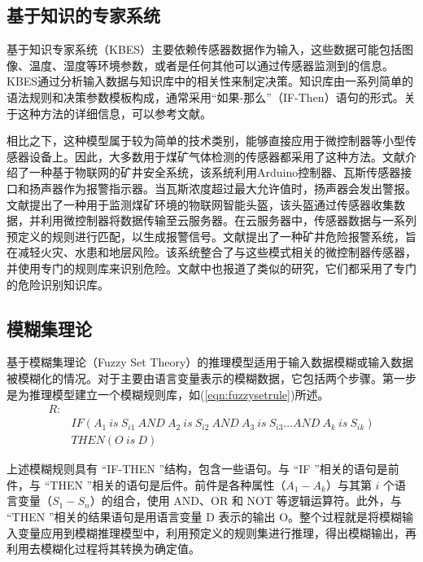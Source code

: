 \documentclass[lang=cn,a4paper,citestyle=gb7714-2015, bibstyle=gb7714-2015]{elegantpaper}
\newcommand{\mycite}[1]{\textsuperscript{\parencite{#1}}}
\begin{document}
    \subsection{基于知识的专家系统}
    基于知识专家系统（KBES）主要依赖传感器数据作为输入，这些数据可能包括图像、温度、湿度等环境参数，或者是任何其他可以通过传感器监测到的信息。KBES通过分析输入数据与知识库中的相关性来制定决策。知识库由一系列简单的语法规则和决策参数模板构成，通常采用“如果-那么”（IF-Then）语句的形式。关于这种方法的详细信息，可以参考文献\mycite{ref59}。

    \bigskip
    相比之下，这种模型属于较为简单的技术类别，能够直接应用于微控制器等小型传感器设备上。因此，大多数用于煤矿气体检测的传感器都采用了这种方法。文献\mycite{Reddy2021}介绍了一种基于物联网的矿井安全系统，该系统利用Arduino控制器、瓦斯传感器接口和扬声器作为报警指示器。当瓦斯浓度超过最大允许值时，扬声器会发出警报。文献\mycite{Singh2022}提出了一种用于监测煤矿环境的物联网智能头盔，该头盔通过传感器收集数据，并利用微控制器将数据传输至云服务器。在云服务器中，传感器数据与一系列预定义的规则进行匹配，以生成报警信号。文献\mycite{Sarkar2021}提出了一种矿井危险报警系统，旨在减轻火灾、水患和地层风险。该系统整合了与这些模式相关的微控制器传感器，并使用专门的规则库来识别危险。文献\mycite{ref25}\mycite{Huang2015}\mycite{Nie2014}中也报道了类似的研究，它们都采用了专门的危险识别知识库。

    \subsection{模糊集理论}
    基于模糊集理论（Fuzzy Set Theory）的推理模型适用于输入数据模糊或输入数据被模糊化的情况\mycite{Khaleghi2013}。对于主要由语言变量表示的模糊数据，它包括两个步骤。第一步是为推理模型建立一个模糊规则库，如(\ref{eqn:fuzzysetrule})所述。
    \begin{equation}
        \begin{aligned}
            R : \\
            &IF(A_1\ is\ S_{i1}\ AND\ A_{2}\ is\ S_{i2}\ AND\ A_3\ is\ S_{i3} \dots AND\ A_k\ is\ S_{ik})\\
            &THEN (O\ is\ D)
        \end{aligned}
        \label{eqn:fuzzysetrule}
    \end{equation}

    上述模糊规则具有 “IF-THEN ”结构，包含一些语句。与 “IF ”相关的语句是前件，与 “THEN ”相关的语句是后件。前件是各种属性（$A_1 - A_k$）与其第 $i$ 个语言变量（$S_1 - S_n$）的组合，使用 AND、OR 和 NOT 等逻辑运算符。此外，与 “THEN ”相关的结果语句是用语言变量 D 表示的输出 O。整个过程就是将模糊输入变量应用到模糊推理模型中，利用预定义的规则集进行推理，得出模糊输出，再利用去模糊化过程将其转换为确定值。
\end{document}
